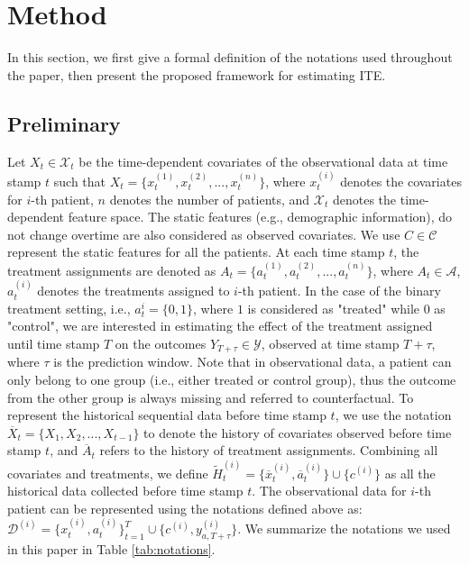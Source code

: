 \section{Method}
In this section, we first give a formal definition of the notations used throughout the paper, then present the proposed framework for estimating ITE.
\subsection{Preliminary}
Let $X_t\in\mathcal{X}_t$ be the time-dependent covariates of the observational data at time stamp $t$ such that $X_t=\{x^{(1)}_{t}, x^{(2)}_{t},...,x^{(n)}_{t}\}$, where $x^{(i)}_{t}$ denotes the covariates for $i$-th patient, $n$ denotes the number of patients, and $\mathcal{X}_t$ denotes the time-dependent feature space. The static features (e.g., demographic information), do not change overtime are also considered as observed covariates. We use $C\in\mathcal{C}$ represent the static features for all the patients. At each time stamp $t$, the treatment assignments are denoted as $A_{t}=\{a^{(1)}_{t},a^{(2)}_{t},...,a^{(n)}_{t}\}$, where $A_{t}\in\mathcal{A}$, $a^{(i)}_{t}$ denotes the treatments assigned to $i$-th patient. In the case of the binary treatment setting, i.e., $a^{i}_{t}=\{0, 1\}$, where $1$ is considered as "treated" while $0$ as "control", we are interested in estimating the effect of the treatment assigned until time stamp $T$ on the outcomes $Y_{T+\tau}\in\mathcal{Y}$, observed at time stamp $T+\tau$, where $\tau$ is the prediction window. Note that in observational data, a patient can only belong to one group (i.e., either treated or control group), thus the outcome from the other group is always missing and referred to counterfactual. To represent the historical sequential data before time stamp $t$, we use the notation $\overline{X}_{t}=\{X_{1},X_{2},...,X_{t-1}\}$ to denote the history of covariates observed before time stamp $t$, and $\overline{A}_{t}$ refers to the history of treatment assignments. Combining all covariates and treatments, we define $\tilde{H}^{(i)}_{t}=\{\overline{x}^{(i)}_{t},\overline{a}^{(i)}_{t}\}\cup\{c^{(i)}\}$ as all the historical data collected before time stamp $t$. The observational data for $i$-th patient can be represented using the notations defined above as: $\mathcal{D}^{(i)}=\{x^{(i)}_{t},a^{(i)}_{t}\}^{T}_{t=1}\cup\{c^{(i)},y^{(i)}_{a,T+\tau}\}$. We summarize the notations we used in this paper in Table \ref{tab:notations}.

